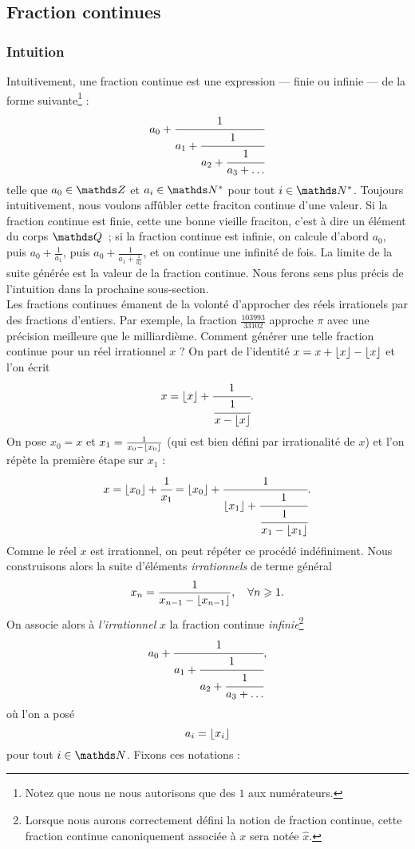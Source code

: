 \subsection{Fraction continues}
\subsubsection{Intuition}

Intuitivement, une fraction continue est une expression — finie ou infinie — de
la forme suivante\footnote{Notez que nous ne nous autorisons que des $1$ aux
numérateurs.} : \[a_0 + \cfrac{1}{a_1 + \cfrac{1}{a_2 + \cfrac{1}{a_3 +
\dots}}}\] telle que $a_0\in \Z$ et $a_i \in \N^*$ pour tout $i\in \N^*$.
Toujours intuitivement, nous voulons affûbler cette fraciton continue d'une
valeur. Si la fraction continue est finie, cette une bonne vieille fraciton,
c'est à dire un élément du corps $\Q$~; si la fraction continue est infinie, on
calcule d'abord $a_0$, puis $a_0 + \frac{1}{a_1}$, puis $a_0 + \frac{1}{a_1
+\frac{1}{a_2}}$, et on continue une infinité de fois. La limite de la suite
générée est la \og{} valeur \fg{} de la fraction continue. Nous ferons sens
plus précis de l'intuition dans la prochaine sous-section. \\

Les fractions continues émanent de la volonté d'approcher des réels irrationels
par des fractions d'entiers. Par exemple, la fraction $\frac{103 993}{33 102}$
approche $\pi$ avec une précision meilleure que le milliardième.  Comment
générer une telle fraction continue pour un réel irrationnel $x$ ?  On part de
l'identité $x = x + \lfloor x\rfloor - \lfloor x\rfloor$ et l'on écrit \[x = \lfloor x\rfloor +
\cfrac{1}{\cfrac{1}{x - \lfloor x\rfloor}}.\] On pose $x_0 = x$ et $x_1 = \frac{1}{x_0 -
\lfloor x_0\rfloor}$ (qui est bien défini par irrationalité de $x$) et l'on répète la
première étape sur $x_1$ : \[x = \lfloor x_0\rfloor + \cfrac{1}{x_1} = \lfloor x_0\rfloor +
\cfrac{1}{\lfloor x_1\rfloor + \cfrac{1}{\cfrac{1}{x_1 - \lfloor x_1\rfloor}}}.\] Comme le réel
$x$ est irrationnel, on peut répéter ce procédé indéfiniment. Nous construisons
alors la suite d'éléments \emph{irrationnels} de terme général \[x_n =
\frac{1}{x_{n-1} - \lfloor x_{n-1}\rfloor}, \quad \forall n \geqslant 1.\] On associe alors à
\emph{l'irrationnel} $x$ la fraction continue \emph{infinie}\footnote{Lorsque
nous aurons correctement défini la notion de fraction continue, cette fraction
continue canoniquement associée à $x$ sera notée $\hat{x}$.} \[a_0 +
\cfrac{1}{a_1 + \cfrac{1}{a_2 + \cfrac{1}{a_3 + \dots}}},\] où l'on a posé
\[a_i = \lfloor x_i\rfloor\] pour tout $i\in \N$. Fixons ces notations :

